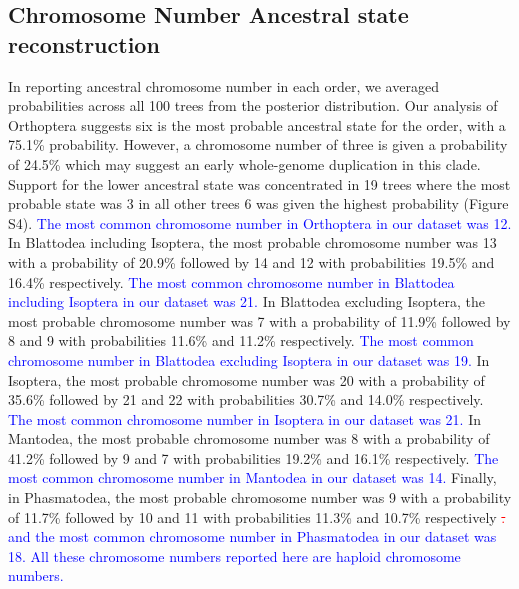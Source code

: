 \documentclass[]{rsos}%
\begin{document}
\subsection{Chromosome Number Ancestral state reconstruction}
In reporting ancestral chromosome number in each order, we averaged probabilities across all 100 trees from the posterior distribution. 
Our analysis of Orthoptera suggests six is the most probable ancestral state for the order, with a 75.1\% probability.
However, a chromosome number of three is given a probability of 24.5\% which may suggest an early whole-genome duplication in this clade.
Support for the lower ancestral state was concentrated in 19 trees where the most probable state was 3 in all other trees 6 was given the highest probability (Figure S4).
\textcolor{blue}{The most common chromosome number in Orthoptera in our dataset was 12.}
In Blattodea including Isoptera, the most probable chromosome number was 13 with a probability of 20.9\% followed by 14 and 12 with probabilities 19.5\% and 16.4\% respectively. 
\textcolor{blue}{The most common chromosome number in Blattodea including Isoptera in our dataset was 21.}
In Blattodea excluding Isoptera, the most probable chromosome number was 7 with a probability of 11.9\% followed by 8 and 9 with probabilities 11.6\% and 11.2\% respectively.
\textcolor{blue}{The most common chromosome number in Blattodea excluding Isoptera in our dataset was 19.}
In Isoptera, the most probable chromosome number was 20 with a probability of 35.6\% followed by 21 and 22 with probabilities 30.7\% and 14.0\% respectively.
\textcolor{blue}{The most common chromosome number in Isoptera in our dataset was 21.}
In Mantodea, the most probable chromosome number was 8 with a probability of 41.2\% followed by 9 and 7 with probabilities 19.2\% and 16.1\% respectively.
\textcolor{blue}{The most common chromosome number in Mantodea in our dataset was 14.}
Finally, in Phasmatodea, the most probable chromosome number was 9 with a probability of 11.7\% followed by 10 and 11 with probabilities 11.3\% and 10.7\% respectively \textcolor{red}{\st{.}} \textcolor{blue}{and  the most common chromosome number in Phasmatodea in our dataset was 18.}
\textcolor{blue}{All these chromosome numbers reported here are haploid chromosome numbers.}
\end{document}
